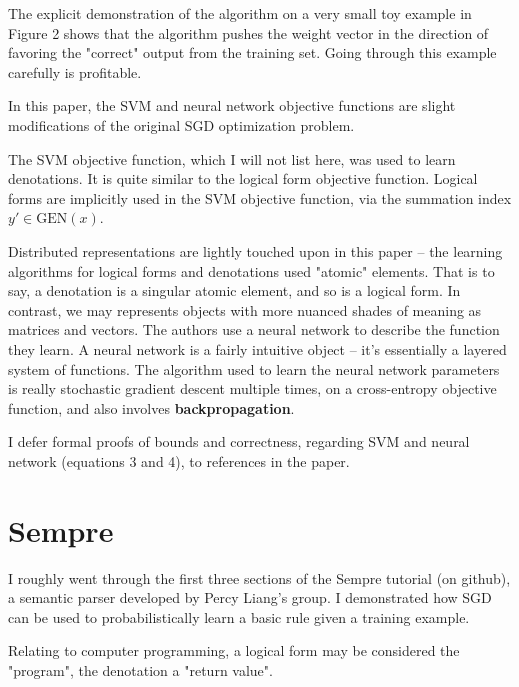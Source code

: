\documentclass[twoside]{article}
\theoremstyle{definition}
\theoremstyle{definition}
\theoremstyle{remark}
\begin{document}
The explicit demonstration of the algorithm on a very small toy example
in Figure 2 shows that the algorithm pushes the weight vector in the direction
of favoring the "correct" output from the training set. Going through this 
example carefully is profitable. 

In this paper, the SVM and neural network
objective functions are slight modifications of the original SGD optimization problem.

The SVM objective function, which I will not list here, was used to learn
denotations. It is quite similar to the logical form objective function. Logical
forms are implicitly used in the SVM objective function, via the summation
index $y' \in \textrm{GEN}(x)$.

Distributed representations are lightly touched upon in this paper -- the learning
algorithms for logical forms and denotations used "atomic" elements. That is to say,
a denotation is a singular atomic element, and so is a logical form. In contrast, we
may represents objects with more nuanced shades of meaning as matrices and vectors.
The authors use a neural network to describe the function they learn. A neural
network is a fairly intuitive object -- it's essentially a layered system of functions.
The algorithm used to learn the neural network parameters is really stochastic gradient
descent multiple times, on a cross-entropy objective function, and also involves
\textbf{backpropagation}.

I defer formal proofs of bounds and correctness, regarding SVM and neural network (equations 3 and 4), to references in the paper.

\section{Sempre}

I roughly went through the first three sections of the Sempre tutorial (on github), a semantic parser developed
by Percy Liang's group. I demonstrated how SGD can be used to probabilistically learn a basic rule given a training example.

Relating to computer programming, a logical form may be considered
the "program", the denotation a "return value".
\end{document}

